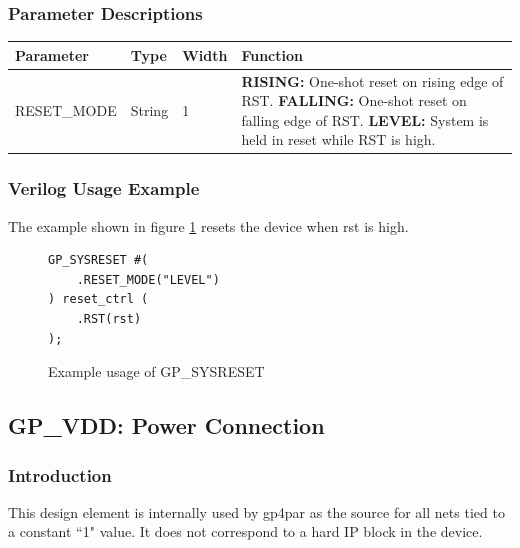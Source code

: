 \documentclass{article}
\begin{document}
\subsubsection{Parameter Descriptions}

\begin{tabularx}{5in}{|l|l|l|X|}
\hline
{\bfseries Parameter} & {\bfseries Type} & {\bfseries Width} & {\bfseries Function} \\
\hline
RESET\_MODE & String & 1 & 
	{\bfseries RISING: } \newline One-shot reset on rising edge of RST. \newline
	{\bfseries FALLING: } \newline One-shot reset on falling edge of RST. \newline
	{\bfseries LEVEL: } \newline System is held in reset while RST is high.\\
\hline
\end{tabularx}

\subsubsection{Verilog Usage Example}

The example shown in figure \ref{gp-sysreset-example} resets the device when rst is high.

\begin{figure}[h]
\begin{lstlisting}
GP_SYSRESET #(
	.RESET_MODE("LEVEL")
) reset_ctrl (
	.RST(rst)
);
\end{lstlisting}
\caption{Example usage of GP\_SYSRESET}
\label{gp-sysreset-example}
\end{figure}


\FloatBarrier
\pagebreak
\subsection{GP\_VDD: Power Connection}

\subsubsection{Introduction}
This design element is internally used by gp4par as the source for all nets tied to a constant ``1" value. It does not 
correspond to a hard IP block in the device.
\end{document}

